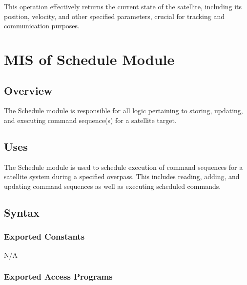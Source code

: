 \documentclass[12pt, titlepage]{article}
\begin{document}
This operation effectively returns the current state of the satellite, including its position, velocity, and other specified parameters, crucial for tracking and communication purposes.

 

\section{MIS of {Schedule Module}} \label{Module} 

\subsection{Overview}

The Schedule module is responsible for all logic pertaining to storing, updating, and executing command sequence(s) for a satellite target.

\subsection{Uses}

The Schedule module is used to schedule execution of command sequences for a satellite system during a specified overpass. This includes reading, adding, and updating command sequences as well as executing scheduled commands.

\subsection{Syntax}

\subsubsection{Exported Constants}

N/A

\subsubsection{Exported Access Programs}
\end{document}
